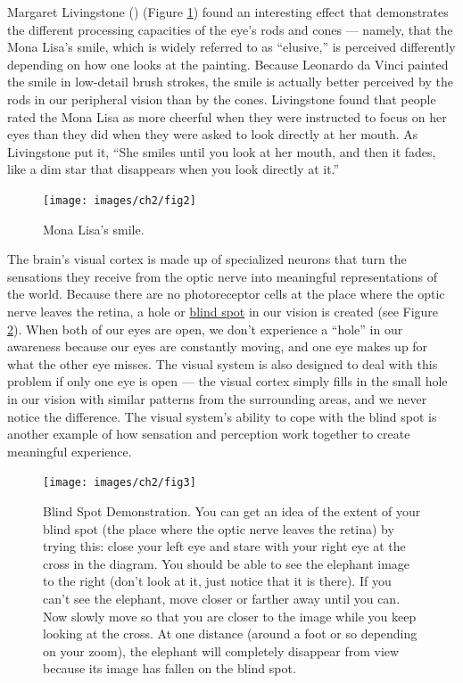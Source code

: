 \documentclass[
]{krantz}
\begin{document}
Margaret Livingstone () (Figure \ref{fig:monalisa}) found an interesting effect that demonstrates the different processing capacities of the eye's rods and cones --- namely, that the Mona Lisa's smile, which is widely referred to as ``elusive,'' is perceived differently depending on how one looks at the painting. Because Leonardo da Vinci painted the smile in low-detail brush strokes, the smile is actually better perceived by the rods in our peripheral vision than by the cones. Livingstone found that people rated the Mona Lisa as more cheerful when they were instructed to focus on her eyes than they did when they were asked to look directly at her mouth. As Livingstone put it, ``She smiles until you look at her mouth, and then it fades, like a dim star that disappears when you look directly at it.''

\begin{figure}

{\centering \texttt{[image: images/ch2/fig2]} 

}

\caption{Mona Lisa's smile.}\label{fig:monalisa}
\end{figure}

The brain's visual cortex is made up of specialized neurons that turn the sensations they receive from the optic nerve into meaningful representations of the world. Because there are no photoreceptor cells at the place where the optic nerve leaves the retina, a hole or \hyperref[blind-spot]{blind spot} in our vision is created (see Figure \ref{fig:blindspot}). When both of our eyes are open, we don't experience a ``hole'' in our awareness because our eyes are constantly moving, and one eye makes up for what the other eye misses. The visual system is also designed to deal with this problem if only one eye is open --- the visual cortex simply fills in the small hole in our vision with similar patterns from the surrounding areas, and we never notice the difference. The visual system's ability to cope with the blind spot is another example of how sensation and perception work together to create meaningful experience.

\begin{figure}

{\centering \texttt{[image: images/ch2/fig3]} 

}

\caption{Blind Spot Demonstration. You can get an idea of the extent of your blind spot (the place where the optic nerve leaves the retina) by trying this: close your left eye and stare with your right eye at the cross in the diagram. You should be able to see the elephant image to the right (don’t look at it, just notice that it is there). If you can’t see the elephant, move closer or farther away until you can. Now slowly move so that you are closer to the image while you keep looking at the cross. At one distance (around a foot or so depending on your zoom), the elephant will completely disappear from view because its image has fallen on the blind spot.}\label{fig:blindspot}
\end{figure}
\end{document}
